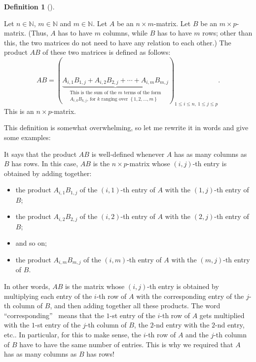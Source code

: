 \documentclass[numbers=enddot,12pt,final,onecolumn,notitlepage]{scrartcl}%
\theoremstyle{definition}
\newtheorem{defi}[theo]{Definition}
\newenvironment{definition}[1][]
{\begin{defi}[#1]\begin{leftbar}}
{\end{leftbar}\end{defi}}
\begin{document}
\begin{definition}
\label{def.AB}Let $n\in\mathbb{N}$, $m\in\mathbb{N}$ and $m\in\mathbb{N}$. Let
$A$ be an $n\times m$-matrix. Let $B$ be an $m\times p$-matrix. (Thus, $A$ has
to have $m$ columns, while $B$ has to have $m$ rows; other than this, the two
matrices do not need to have any relation to each other.) The product $AB$ of
these two matrices is defined as follows:%
\[
AB=\left(  \underbrace{A_{i,1}B_{1,j}+A_{i,2}B_{2,j}+\cdots+A_{i,m}B_{m,j}%
}_{\substack{\text{This is the sum of the }m\text{ terms of the form}%
\\A_{i,k}B_{k,j}\text{, for }k\text{ ranging over }\left\{  1,2,\ldots
,m\right\}  }}\right)  _{1\leq i\leq n,\ 1\leq j\leq p}.
\]
This is an $n\times p$-matrix.
\end{definition}

This definition is somewhat overwhelming, so let me rewrite it in words and
give some examples:

It says that the product $AB$ is well-defined whenever $A$ has as many columns
as $B$ has rows. In this case, $AB$ is the $n\times p$-matrix whose $\left(
i,j\right)  $-th entry is obtained by adding together:

\begin{itemize}
\item the product $A_{i,1}B_{1,j}$ of the $\left(  i,1\right)  $-th entry of
$A$ with the $\left(  1,j\right)  $-th entry of $B$;

\item the product $A_{i,2}B_{2,j}$ of the $\left(  i,2\right)  $-th entry of
$A$ with the $\left(  2,j\right)  $-th entry of $B$;

\item and so on;

\item the product $A_{i,m}B_{m,j}$ of the $\left(  i,m\right)  $-th entry of
$A$ with the $\left(  m,j\right)  $-th entry of $B$.
\end{itemize}

In other words, $AB$ is the matrix whose $\left(  i,j\right)  $-th entry is
obtained by multiplying each entry of the $i$-th row of $A$ with the
corresponding entry of the $j$-th column of $B$, and then adding together all
these products. The word \textquotedblleft corresponding\textquotedblright%
\ means that the $1$-st entry of the $i$-th row of $A$ gets multiplied with
the $1$-st entry of the $j$-th column of $B$, the $2$-nd entry with the $2$-nd
entry, etc.. In particular, for this to make sense, the $i$-th row of $A$ and
the $j$-th column of $B$ have to have the same number of entries. This is why
we required that $A$ has as many columns as $B$ has rows!
\end{document}
